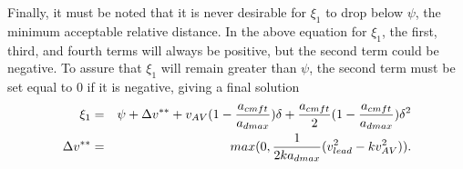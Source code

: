 \documentclass[conference]{IEEEtran}
\begin{document}
\begin{appendix}
Finally, it must be noted that it is never desirable for $\xi_1$ to drop below $\psi$, the minimum acceptable relative distance. In the above equation for $\xi_1$, the first, third, and fourth terms will always be positive, but the second term could be negative. To assure that $\xi_1$ will remain greater than $\psi$, the second term must be set equal to 0 if it is negative, giving a final solution
\begin{eqnarray*}
\xi_1 &=& \psi+\Delta v^{**}+v_{AV}(1-{a_{cmft}\over a_{dmax}})\delta+{a_{cmft}\over 2}(1-{a_{cmft}\over a_{dmax}})\delta^2 \\
\Delta v^{**} &=& max(0,{1\over 2ka_{dmax}}(v_{lead}^2-kv_{AV}^2)).
\end{eqnarray*}


\end{appendix}
\end{document}
